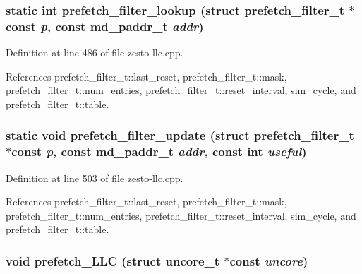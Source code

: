 \subsubsection[{prefetch\_\-filter\_\-lookup}]{\setlength{\rightskip}{0pt plus 5cm}static int prefetch\_\-filter\_\-lookup (struct {\bf prefetch\_\-filter\_\-t} $\ast$const  {\em p}, \/  const {\bf md\_\-paddr\_\-t} {\em addr})\hspace{0.3cm}{\tt  [static]}}\label{zesto-llc_8cpp_17dbb4e8d2ae84f22541bef1c04253de}




Definition at line 486 of file zesto-llc.cpp.

References prefetch\_\-filter\_\-t::last\_\-reset, prefetch\_\-filter\_\-t::mask, prefetch\_\-filter\_\-t::num\_\-entries, prefetch\_\-filter\_\-t::reset\_\-interval, sim\_\-cycle, and prefetch\_\-filter\_\-t::table.
\subsubsection[{prefetch\_\-filter\_\-update}]{\setlength{\rightskip}{0pt plus 5cm}static void prefetch\_\-filter\_\-update (struct {\bf prefetch\_\-filter\_\-t} $\ast$const  {\em p}, \/  const {\bf md\_\-paddr\_\-t} {\em addr}, \/  const int {\em useful})\hspace{0.3cm}{\tt  [static]}}\label{zesto-llc_8cpp_7867a082122e5a85b7e880d3bfb243f9}




Definition at line 503 of file zesto-llc.cpp.

References prefetch\_\-filter\_\-t::last\_\-reset, prefetch\_\-filter\_\-t::mask, prefetch\_\-filter\_\-t::num\_\-entries, prefetch\_\-filter\_\-t::reset\_\-interval, sim\_\-cycle, and prefetch\_\-filter\_\-t::table.
\subsubsection[{prefetch\_\-LLC}]{\setlength{\rightskip}{0pt plus 5cm}void prefetch\_\-LLC (struct {\bf uncore\_\-t} $\ast$const  {\em uncore})}\label{zesto-llc_8cpp_8ed5f90d7b07bddefbf6736b13da8eb2}




